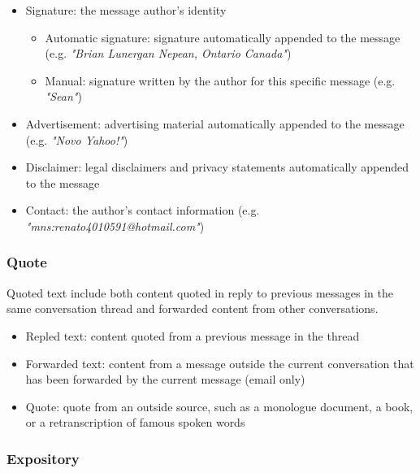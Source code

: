 \documentclass[11pt]{article}
\begin{document}
\begin{itemize}
	\item Signature: the message author's identity
		\begin{itemize}
			\item Automatic signature: signature automatically appended to the message (e.g. \textit{"Brian Lunergan Nepean, Ontario Canada"})
			\item Manual: signature written by the author for this specific message (e.g. \textit{"Sean"})
		\end{itemize}
	\item Advertisement: advertising material automatically appended to the message (e.g. \textit{"Novo Yahoo!"})
	\item Disclaimer: legal disclaimers and privacy statements automatically appended to the message
	\item Contact: the author's contact information (e.g. \textit{"mns:renato4010591@hotmail.com"})
\end{itemize}

\subsubsection{Quote}

Quoted text include both content quoted in reply to previous messages in the same conversation thread and forwarded content from other conversations.

\begin{itemize}
	\item Repled text: content quoted from a previous message in the thread
	\item Forwarded text: content from a message outside the current conversation that has been forwarded by the current message (email only)
	\item Quote: quote from an outside source, such as a monologue document, a book, or a retranscription of famous spoken words
\end{itemize}

\subsubsection{Expository}
\end{document}
